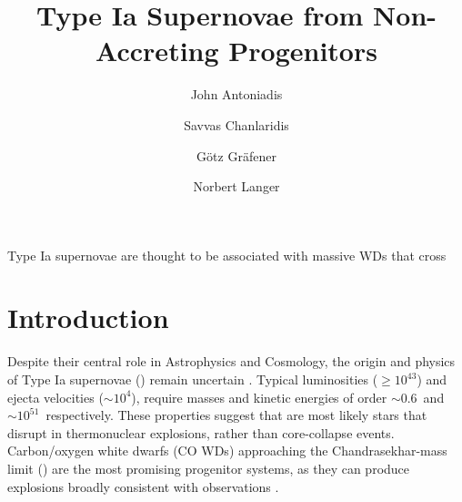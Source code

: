 \documentclass[twocolumn,tighten,times]{aastex62}
\begin{document}
\title{Type Ia Supernovae from Non-Accreting Progenitors}
Type Ia supernovae are thought to be associated with massive WDs that cross 



\author[0000-0002-0786-7307]{John Antoniadis}


\author[0000-0002-9323-9728]{Savvas Chanlaridis}
\author{G\"{o}tz Gr\"{a}fener}
\author{Norbert Langer}

\begin{abstract}
\end{abstract}


\section{Introduction} \label{sec:intro}

 Despite their central role in Astrophysics and Cosmology, 
 the origin and physics of Type Ia supernovae (\ias)
remain uncertain  \citep[][]{Maoz:2013hna}. 
Typical \ia  luminosities ($\ge 10^{43}$\ergs) and ejecta velocities  
($ \sim 10^{4}$\kms), require   
masses and kinetic energies of order 
$\sim 0.6$\msun\ and $\sim 10^{51}$\erg\ respectively. 
 These properties suggest that \ias are most likely 
 stars that disrupt in  thermonuclear explosions, 
 rather than core-collapse events. 
 Carbon/oxygen white dwarfs (CO WDs) 
 approaching the Chandrasekhar-mass limit (\mch)
 are the most promising progenitor systems, as they can 
 produce explosions broadly consistent with observations
 \citep{Nomoto:1982zz,Churazov:2014bga}. %
 
\end{document}
